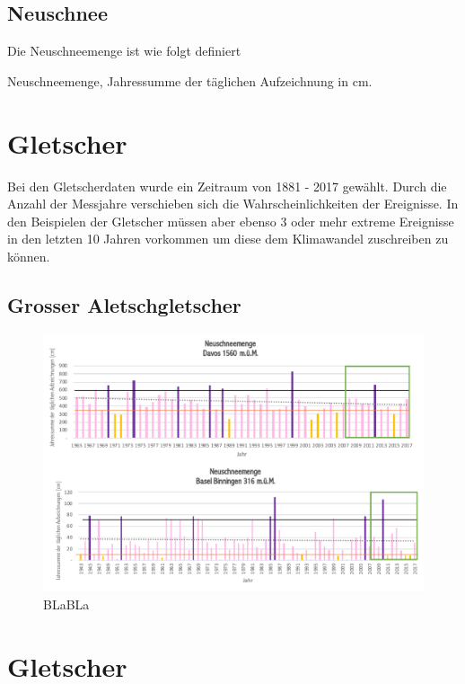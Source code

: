\begin{refsection}
\subsection{Neuschnee}
Die Neuschneemenge ist wie folgt definiert

\begin{definition}
Neuschneemenge, Jahressumme der täglichen Aufzeichnung in cm.
\end{definition}




\section{Gletscher}
Bei den Gletscherdaten wurde ein Zeitraum von 1881 - 2017 gewählt. Durch die Anzahl der Messjahre verschieben sich die Wahrscheinlichkeiten der Ereignisse. In den Beispielen der Gletscher müssen aber ebenso 3 oder mehr extreme Ereignisse in den letzten 10 Jahren vorkommen um diese dem Klimawandel zuschreiben zu können.

\subsection{Grosser Aletschgletscher}


\begin{figure}[htbp]
\centering
\includegraphics[width=1.0\textwidth]{extrem/Neuschnee.pdf}
\caption{BLaBLa}
\label{Neuschnee}
\end{figure}


\section{Gletscher}



\end{refsection}

